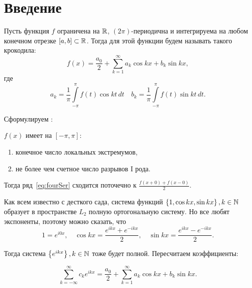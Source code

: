 \documentclass[../main.tex]{subfiles}
\begin{document}
\section{Введение}

\begin{Def}\label{def:fourSer}
    Пусть функция $f$ ограничена на $\mathbb{R}$,  $(2\pi)$-периодична и
    интегрируема на любом конечном отрезке $[a, b] \subset \mathbb{R}$.
    Тогда  для этой функции будем называть такого крокодила:
    \begin{equation}\label{eq:fourSer}
        f(x) = \frac{a_0}{2} + \sum\limits_{k=1}^{\infty}
        a_k \cos kx + b_k \sin kx
    ,\end{equation}
    где
    \begin{equation}\label{eq:coeffFourSer}
        a_k = \frac{1}{\pi}\int\limits_{-\pi}^{\pi} f(t) \cos kt \,dt \quad
        b_k = \frac{1}{\pi}\int\limits_{-\pi}^{\pi} f(t) \sin kt \,dt 
    .\end{equation} 
\end{Def} 

Сформулируем :\\
\begin{Th}
    $f(x)$ имеет на $[-\pi, \pi]$:
\begin{enumerate}
    \item конечное число локальных экстремумов,
    \item не более чем счетное число разрывов I рода.
\end{enumerate} 
Тогда ряд~\eqref{eq:fourSer} сходится поточечно к $\frac{f(x + 0) + f(x - 0)}{2}$.
\end{Th}

Как всем известно с десткого сада, система функций
$\left\{ 1, \cos kx, \sin kx \right\}, k \in \mathbb{N}$ образует в пространстве
$L_2$ полную ортогональную систему.
Но все любят экспоненты, поэтому можно сказать, что
\begin{equation*}
    1 = e^{i0x}, \quad
    \cos kx = \frac{e^{ikx} + e^{-ikx}}{2}, \quad
    \sin kx = \frac{e^{ikx} - e^{-ikx}}{2}
.\end{equation*} 

Тогда система $\left\{ e^{ikx} \right\}, k \in \mathbb{N}$ тоже будет полной.
Пересчитаем коэффициенты:

\begin{equation*}
    \sum\limits_{k=-\infty}^{\infty} c_k e^{ikx} = \frac{a_0}{2} +
    \sum\limits_{k=1}^{\infty} a_k \cos kx + b_k \sin kx 
.\end{equation*} 
\end{document}

